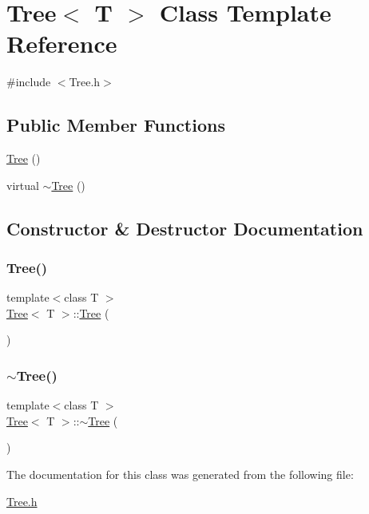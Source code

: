 \hypertarget{class_tree}{}\section{Tree$<$ T $>$ Class Template Reference}
\label{class_tree}


{\ttfamily \#include $<$Tree.\+h$>$}

\subsection*{Public Member Functions}
\begin{DoxyCompactItemize}
\item 
\hyperlink{class_tree_a30ebe31999547d31fea5b40cc805f6a2}{Tree} ()
\item 
virtual \hyperlink{class_tree_a04affc46d89a0ef5d517ab685c9c346e}{$\sim$\+Tree} ()
\end{DoxyCompactItemize}


\subsection{Constructor \& Destructor Documentation}
\mbox{\label{class_tree_a30ebe31999547d31fea5b40cc805f6a2}} 
\subsubsection{\texorpdfstring{Tree()}{Tree()}}
{\footnotesize\ttfamily template$<$class T $>$ \\
\hyperlink{class_tree}{Tree}$<$ T $>$\+::\hyperlink{class_tree}{Tree} (\begin{DoxyParamCaption}{ }\end{DoxyParamCaption})}

\mbox{\label{class_tree_a04affc46d89a0ef5d517ab685c9c346e}} 
\subsubsection{\texorpdfstring{$\sim$\+Tree()}{~Tree()}}
{\footnotesize\ttfamily template$<$class T $>$ \\
\hyperlink{class_tree}{Tree}$<$ T $>$\+::$\sim$\hyperlink{class_tree}{Tree} (\begin{DoxyParamCaption}{ }\end{DoxyParamCaption})\hspace{0.3cm}{\ttfamily [virtual]}}



The documentation for this class was generated from the following file\+:\begin{DoxyCompactItemize}
\item 
\hyperlink{_tree_8h}{Tree.\+h}\end{DoxyCompactItemize}
